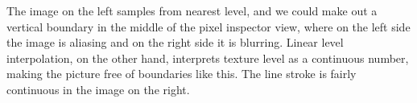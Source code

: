 \documentclass[11pt]{article}
\begin{document}
The image on the left samples from nearest level, and we could make out a vertical boundary in the middle of the pixel inspector view, where on the left side the image is aliasing and on the right side it is blurring. Linear level interpolation, on the other hand, interprets texture level as a continuous number, making the picture free of boundaries like this. The line stroke is fairly continuous in the image on the right.
\end{document}
